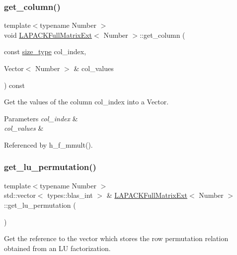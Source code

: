 \subsubsection{\texorpdfstring{get\+\_\+column()}{get\_column()}}
{\footnotesize\ttfamily template$<$typename Number $>$ \\
void \hyperlink{classLAPACKFullMatrixExt}{L\+A\+P\+A\+C\+K\+Full\+Matrix\+Ext}$<$ Number $>$\+::get\+\_\+column (\begin{DoxyParamCaption}\item[{const \hyperlink{classLAPACKFullMatrixExt_a5cf5f4a6104dc17029210b5ca52bf574}{size\+\_\+type}}]{col\+\_\+index,  }\item[{Vector$<$ Number $>$ \&}]{col\+\_\+values }\end{DoxyParamCaption}) const}

Get the values of the column {\ttfamily col\+\_\+index} into a {\ttfamily Vector}. 
\begin{DoxyParams}{Parameters}
{\em col\+\_\+index} & \\
\hline
{\em col\+\_\+values} & \\
\hline
\end{DoxyParams}


Referenced by h\+\_\+f\+\_\+mmult().

\mbox{\label{classLAPACKFullMatrixExt_a623bea36c16f0320c2f750f5881f9214}} 
\subsubsection{\texorpdfstring{get\+\_\+lu\+\_\+permutation()}{get\_lu\_permutation()}\hspace{0.1cm}{\footnotesize\ttfamily [1/2]}}
{\footnotesize\ttfamily template$<$typename Number $>$ \\
std\+::vector$<$ types\+::blas\+\_\+int $>$ \& \hyperlink{classLAPACKFullMatrixExt}{L\+A\+P\+A\+C\+K\+Full\+Matrix\+Ext}$<$ Number $>$\+::get\+\_\+lu\+\_\+permutation (\begin{DoxyParamCaption}{ }\end{DoxyParamCaption})}

Get the reference to the vector which stores the row permutation relation obtained from an LU factorization.

